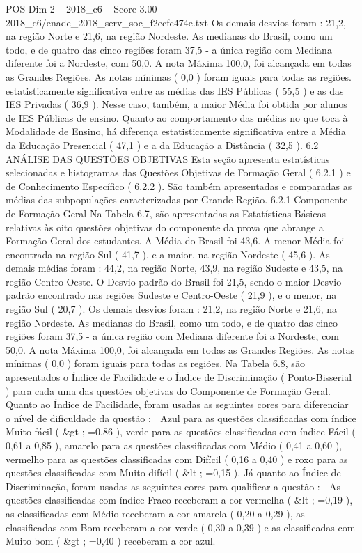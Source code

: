 \begin{textsample}{POS Dim 2 – 2018\_c6 – Score 3.00 – 2018\_c6/enade\_2018\_serv\_soc\_f2ecfc474e.txt}
Os demais desvios foram : 21,2, na região Norte e 21,6, na região Nordeste.
As medianas do Brasil, como um todo, e de quatro das cinco regiões foram 37,5 - a única região com Mediana diferente foi a Nordeste, com 50,0.
A nota Máxima 100,0, foi alcançada em todas as Grandes Regiões.
As notas mínimas ( 0,0 ) foram iguais para todas as regiões. estatisticamente significativa entre as médias das IES Públicas ( 55,5 ) e as das IES Privadas ( 36,9 ).
Nesse caso, também, a maior Média foi obtida por alunos de IES Públicas de ensino.
Quanto ao comportamento das médias no que toca à Modalidade de Ensino, há diferença estatisticamente significativa entre a Média da Educação Presencial ( 47,1 ) e a da Educação a Distância ( 32,5 ). 6.2 ANÁLISE DAS QUESTÕES OBJETIVAS Esta seção apresenta estatísticas selecionadas e histogramas das Questões Objetivas de Formação Geral ( 6.2.1 ) e de Conhecimento Específico ( 6.2.2 ).
São também apresentadas e comparadas as médias das subpopulações caracterizadas por Grande Região. 6.2.1 Componente de Formação Geral Na Tabela 6.7, são apresentadas as Estatísticas Básicas relativas às oito questões objetivas do componente da prova que abrange a Formação Geral dos estudantes.
A Média do Brasil foi 43,6.
A menor Média foi encontrada na região Sul ( 41,7 ), e a maior, na região Nordeste ( 45,6 ).
As demais médias foram : 44,2, na região Norte, 43,9, na região Sudeste e 43,5, na região Centro-Oeste.
O Desvio padrão do Brasil foi 21,5, sendo o maior Desvio padrão encontrado nas regiões Sudeste e Centro-Oeste ( 21,9 ), e o menor, na região Sul ( 20,7 ).
Os demais desvios foram : 21,2, na região Norte e 21,6, na região Nordeste.
As medianas do Brasil, como um todo, e de quatro das cinco regiões foram 37,5 - a única região com Mediana diferente foi a Nordeste, com 50,0.
A nota Máxima 100,0, foi alcançada em todas as Grandes Regiões.
As notas mínimas ( 0,0 ) foram iguais para todas as regiões.
Na Tabela 6.8, são apresentados o Índice de Facilidade e o Índice de Discriminação ( Ponto-Bisserial ) para cada uma das questões objetivas do Componente de Formação Geral.
Quanto ao Índice de Facilidade, foram usadas as seguintes cores para diferenciar o nível de dificuldade da questão :  Azul para as questões classificadas com índice Muito fácil ( \&gt ; =0,86 ), verde para as questões classificadas com índice Fácil ( 0,61 a 0,85 ), amarelo para as questões classificadas com Médio ( 0,41 a 0,60 ), vermelho para as questões classificadas com Difícil ( 0,16 a 0,40 ) e roxo para as questões classificadas com Muito difícil ( \&lt ; =0,15 ).
Já quanto ao Índice de Discriminação, foram usadas as seguintes cores para qualificar a questão :  As questões classificadas com índice Fraco receberam a cor vermelha ( \&lt ; =0,19 ), as classificadas com Médio receberam a cor amarela ( 0,20 a 0,29 ), as classificadas com Bom receberam a cor verde ( 0,30 a 0,39 ) e as classificadas com Muito bom ( \&gt ; =0,40 ) receberam a cor azul.

\end{textsample}

